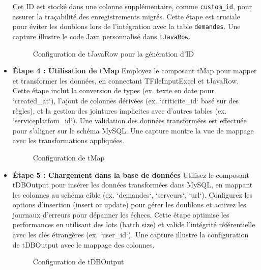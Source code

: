 \begin{itemize}
Cet ID est stocké dans une colonne supplémentaire, comme \texttt{custom\_id}, pour assurer la traçabilité des enregistrements migrés. Cette étape est cruciale pour éviter les doublons lors de l’intégration avec la table \texttt{demandes}. Une capture illustre le code Java personnalisé dans \texttt{tJavaRow}.
      
      \begin{figure}[h]
          \centering
          \caption{Configuration de tJavaRow pour la génération d’ID}
          \label{fig:etl_step3}
      \end{figure}
      
    \item \textbf{Étape 4 : Utilisation de tMap}  
      Employez le composant tMap pour mapper et transformer les données, en connectant TFileInputExcel et tJavaRow. Cette étape inclut la conversion de types (ex. texte en date pour `created\_at`), l’ajout de colonnes dérivées (ex. `criticite\_id` basé sur des règles), et la gestion des jointures implicites avec d’autres tables (ex. `serviceplatfom\_id`). Une validation des données transformées est effectuée pour s’aligner sur le schéma MySQL. Une capture montre la vue de mappage avec les transformations appliquées.
      
      \begin{figure}[h]
          \centering
          \caption{Configuration de tMap}
          \label{fig:etl_step4}
      \end{figure}
      
    \item \textbf{Étape 5 : Chargement dans la base de données}  
      Utilisez le composant tDBOutput pour insérer les données transformées dans MySQL, en mappant les colonnes au schéma cible (ex. `demandes`, `serveurs`, `url`). Configurez les options d’insertion (insert or update) pour gérer les doublons et activez les journaux d’erreurs pour dépanner les échecs. Cette étape optimise les performances en utilisant des lots (batch size) et valide l’intégrité référentielle avec les clés étrangères (ex. `user\_id`). Une capture illustre la configuration de tDBOutput avec le mappage des colonnes.
      
      \begin{figure}[h]
          \centering
          \caption{Configuration de tDBOutput}
          \label{fig:etl_step5}
      \end{figure}
\end{itemize}

